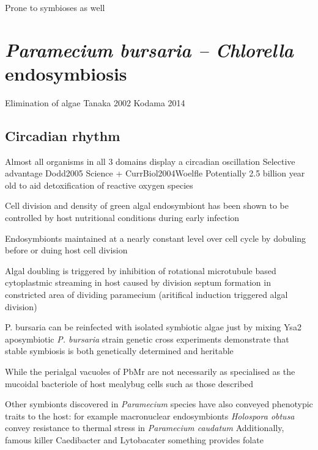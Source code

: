 Prone to symbioses as well


\section{\textit{Paramecium bursaria – Chlorella} endosymbiosis}









Elimination of algae Tanaka 2002 
Kodama 2014

\subsection{Circadian rhythm}

Almost all organisms in all 3 domains display a circadian oscillation 
Selective advantage Dodd2005 Science + CurrBiol2004Woelfle 
Potentially 2.5 billion year old to aid detoxification of reactive oxygen species \cite{Loudon2012}

Cell division and density of green algal endosymbiont has been shown to be controlled by host nutritional 
conditions during early infection \citep{Kodama2012a}

Endosymbionts maintained at a nearly constant level over cell cycle by dobuling before or duing host cell
division 


Algal doubling is triggered by inhibition of rotational microtubule based cytoplastmic streaming in host 
caused by division septum formation in constricted area of dividing paramecium (aritifical induction 
triggered algal division) \citep{Takahashi2007}

P. bursaria can be reinfected with isolated symbiotic algae just by mixing \citep{Siegel1959}
Ysa2 aposymbiotic \textit{P. bursaria} strain genetic cross experiments demonstrate that stable symbiosis
is both genetically determined and heritable \citep{Tonooka2007}


While the perialgal vacuoles of PbMr are not necessarily as specialised as the 
mucoidal bacteriole of host mealybug cells such as those described \citep{vonDohlen2001}

Other symbionts discovered in \textit{Paramecium} species have also conveyed phenotypic traits to the host:
for example macronuclear endosymbionts \textit{Holospora obtusa} convey resistance to thermal stress in \textit{Paramecium caudatum} 
\citep{Fujishima2005}
Additionally, famous killer Caedibacter and Lytobacater something provides folate


